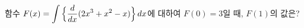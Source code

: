 함수 $F(x)=\displaystyle\int\Big\{\dfrac{d}{dx}(2x^3+x^2-x)\Big\}\mkern3mu dx$에 대하여 $F(0)=3$일 때, $F(1)$의 값은?
